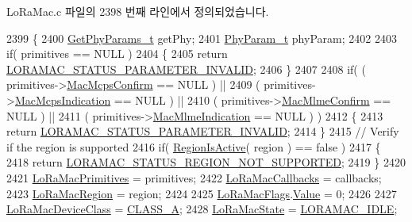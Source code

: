 Lo\+Ra\+Mac.\+c 파일의 2398 번째 라인에서 정의되었습니다.


\begin{DoxyCode}
2399 \{
2400     \mbox{\hyperlink{structs_get_phy_params}{GetPhyParams\_t}} getPhy;
2401     \mbox{\hyperlink{unionu_phy_param}{PhyParam\_t}} phyParam;
2402 
2403     \textcolor{keywordflow}{if}( primitives == NULL )
2404     \{
2405         \textcolor{keywordflow}{return} \mbox{\hyperlink{group___l_o_r_a_m_a_c_gga1d18f26b344040b3ec5c3db662919661ad0d3119f247d00e1787dda106fcb3017}{LORAMAC\_STATUS\_PARAMETER\_INVALID}};
2406     \}
2407 
2408     \textcolor{keywordflow}{if}( ( primitives->\mbox{\hyperlink{structs_lo_ra_mac_primitives_a2b7cb648bbe609f5fb6fe4e3d0bcda41}{MacMcpsConfirm}} == NULL ) ||
2409         ( primitives->\mbox{\hyperlink{structs_lo_ra_mac_primitives_a89cb88517df5ff62828e4cf29454d9e5}{MacMcpsIndication}} == NULL ) ||
2410         ( primitives->\mbox{\hyperlink{structs_lo_ra_mac_primitives_ade47d176982e0843084c5932445898a2}{MacMlmeConfirm}} == NULL ) ||
2411         ( primitives->\mbox{\hyperlink{structs_lo_ra_mac_primitives_a353881c42ec9e21f3112dd548a3da87a}{MacMlmeIndication}} == NULL ) )
2412     \{
2413         \textcolor{keywordflow}{return} \mbox{\hyperlink{group___l_o_r_a_m_a_c_gga1d18f26b344040b3ec5c3db662919661ad0d3119f247d00e1787dda106fcb3017}{LORAMAC\_STATUS\_PARAMETER\_INVALID}};
2414     \}
2415     \textcolor{comment}{// Verify if the region is supported}
2416     \textcolor{keywordflow}{if}( \mbox{\hyperlink{group___r_e_g_i_o_n_ga3e5cf2322f71f8f9973718024b6fb782}{RegionIsActive}}( region ) == \textcolor{keyword}{false} )
2417     \{
2418         \textcolor{keywordflow}{return} \mbox{\hyperlink{group___l_o_r_a_m_a_c_gga1d18f26b344040b3ec5c3db662919661af424839424174be5fc5e52e00160940e}{LORAMAC\_STATUS\_REGION\_NOT\_SUPPORTED}};
2419     \}
2420 
2421     \mbox{\hyperlink{_lo_ra_mac_8c_a18bac241dfa18d510ea2e53f0c740bd3}{LoRaMacPrimitives}} = primitives;
2422     \mbox{\hyperlink{_lo_ra_mac_8c_a186b26684514ac88ef7306c45f96dbe3}{LoRaMacCallbacks}} = callbacks;
2423     \mbox{\hyperlink{_lo_ra_mac_8c_ab3e53bd4a0f4e547c9dbf450406acfe5}{LoRaMacRegion}} = region;
2424 
2425     \mbox{\hyperlink{_lo_ra_mac_8c_ae3a39c60e22c9458dd8536a1b2b773e3}{LoRaMacFlags}}.\mbox{\hyperlink{unione_lo_ra_mac_flags__t_a88f4d00bdab99ae6f48c7ae0bc468bb4}{Value}} = 0;
2426 
2427     \mbox{\hyperlink{_lo_ra_mac_8c_a8c598791e366e3d4eacea1b945391f83}{LoRaMacDeviceClass}} = \mbox{\hyperlink{group___l_o_r_a_m_a_c_gga133e92597739340bac439d1b0916dcb6a307ee33f71385819abc142fe4f23c3bb}{CLASS\_A}};
2428     \mbox{\hyperlink{_lo_ra_mac_8c_a53bc4ca09907ed24a1be62fa76c310ca}{LoRaMacState}} = \mbox{\hyperlink{_lo_ra_mac_8c_ada0bdc03d52b5bf536f021dcea7c4490a3af5105c630ff1cfa443789cfa2f318c}{LORAMAC\_IDLE}};

\end{DoxyCode}
